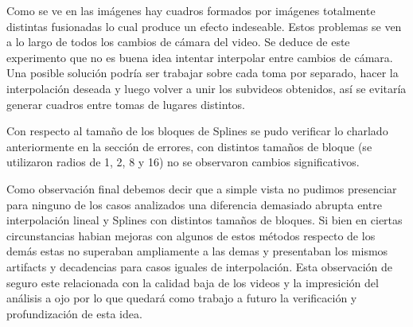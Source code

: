 Como se ve en las imágenes hay cuadros formados por imágenes totalmente distintas fusionadas lo cual produce un efecto indeseable. Estos problemas se ven a lo largo de todos los cambios de cámara del video. Se deduce de este experimento que no es buena idea intentar interpolar entre cambios de cámara. Una posible solución podría ser trabajar sobre cada toma por separado, hacer la interpolación deseada y luego volver a unir los subvideos obtenidos, así se evitaría generar cuadros entre tomas de lugares distintos.

Con respecto al tamaño de los bloques de Splines se pudo verificar lo charlado anteriormente en la sección de errores, con distintos tamaños de bloque (se utilizaron radios de 1, 2, 8 y 16) no se observaron cambios significativos.

Como observación final debemos decir que a simple vista no pudimos presenciar para ninguno de los casos analizados una diferencia demasiado abrupta entre interpolación lineal y Splines con distintos tamaños de bloques. Si bien en ciertas circunstancias habian mejoras con algunos de estos métodos respecto de los demás estas no superaban ampliamente a las demas y presentaban los mismos artifacts y decadencias para casos iguales de interpolación. Esta observación de seguro este relacionada con la calidad baja de los videos y la impresición del análisis a ojo por lo que quedará como trabajo a futuro la verificación y profundización de esta idea.
